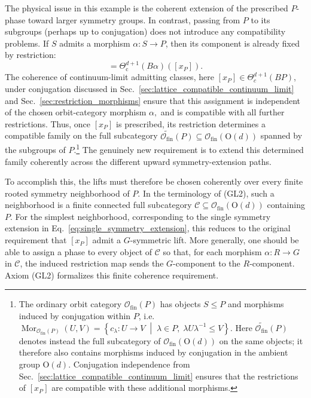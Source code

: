 \documentclass[aps,prx,reprint,superscriptaddress,twocolumn,amsmath,amssymb,amsfonts, nofootinbib]{revtex4-2}
\newcommand{\ofin}{\mathcal{O}_{\text{fin}}}
\theoremstyle{apsstyle}
\begin{document}
The physical issue in this example is the coherent extension of the prescribed $P$-phase toward larger symmetry groups. In contrast, passing from $P$ to its subgroups (perhaps up to conjugation) does not introduce any compatibility problems. If $S$ admits a morphism $\alpha:S\to P$, then its component is already fixed by restriction:
\begin{equation*}
[x_S] = \Theta_{\mathrm c}^{d+1}(B\alpha)([x_P]).
\end{equation*}
The coherence of continuum-limit admitting classes, here $[x_{P}]\in \Theta^{d+1}_{c}(BP)$, under conjugation discussed in Sec.~\ref{sec:lattice_compatible_continuum_limit} and Sec.~\ref{sec:restriction_morphisms} ensure that this assignment is independent of the chosen orbit-category morphism $\alpha,$ and is compatible with all further restrictions. 
Thus, once $[x_P]$ is prescribed, its restriction determines a
compatible family on the full subcategory $\widetilde{\ofin}(P)\subseteq\ofin(\mathrm{O}(d))$ spanned by the subgroups of $P$.\footnote{The ordinary orbit category $\ofin(P)$ has objects $S\le P$ and morphisms induced by conjugation within $P$, i.e. $\operatorname{Mor}_{\ofin(P)}(U,V)
= \left\{ c_\lambda:U\to V \;\middle|\; \lambda\in P,\; \lambda U\lambda^{-1}\leq V \right\}$. Here $\widetilde{\ofin}(P)$ denotes instead the full subcategory of $\ofin(\mathrm{O}(d))$ on the same objects; it therefore also contains morphisms induced by conjugation in the ambient group $\mathrm{O}(d)$. Conjugation independence from Sec.~\ref{sec:lattice_compatible_continuum_limit} ensures that the restrictions of $[x_P]$ are compatible with these additional morphisms.}
The genuinely new requirement is to extend this determined family coherently across the different upward symmetry-extension paths.

\medskip 

To accomplish this, the lifts must therefore be chosen coherently over every finite rooted symmetry neighborhood of $P$. In the terminology of (GL2), such a neighborhood is a finite connected full subcategory $\mathcal C\subseteq\ofin(\mathrm{O}(d))$ containing $P$. For the simplest neighborhood, corresponding to the single symmetry extension in Eq.~\eqref{eq:single_symmetry_extension}, this reduces to the original requirement that $[x_P]$ admit a $G$-symmetric lift. More generally, one should be able to assign a phase to every object of $\mathcal C$ so that, for each morphism $\alpha:R\to G$ in $\mathcal C$, the induced restriction map sends the $G$-component to the $R$-component. Axiom (GL2) formalizes this finite coherence requirement.
\end{document}
